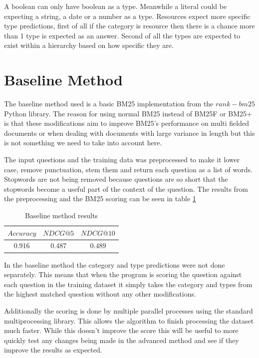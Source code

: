 \documentclass[sigconf]{acmart}
\begin{document}
A boolean can only have boolean as a type. Meanwhile a literal could be expecting a string, a date or a number as a type. Resources expect more specific type predictions, first of all if the category is resource then there is a chance more than 1 type is expected as an answer. Second of all the types are expected to exist within a hierarchy based on how specific they are.



\section{Baseline Method}
The baseline method used is a basic BM25 implementation from the $rank-bm25$ Python library. The reason for using normal BM25 instead of BM25F or BM25+ is that these modifications aim to improve BM25's performance on multi fielded documents or when dealing with documents with large variance in length but this is not something we need to take into account here.

The input questions and the training data was preprocessed to make it lower case, remove punctuation, stem them and return each question as a list of words. Stopwords are not being removed because questions are so short that the stopwords become a useful part of the context of the question. The results from the preprocessing and the BM25 scoring can be seen in table \ref{tab:baseline_res}

\begin{table}[h]
    \centering
    \caption{Baseline method results}
    \begin{tabular}{c|c|c}
    $Accuracy$ & $NDCG@5$ & $NDCG@10$ \\
    \hline
    0.916 & 0.487 & 0.489
    \end{tabular}
    \label{tab:baseline_res}
\end{table}

In the baseline method the category and type predictions were not done separately. This means that when the program is scoring the question against each question in the training dataset it simply takes the category and types from the highest matched question without any other modifications.

Additionally the scoring is done by multiple parallel processes using the standard multiprocessing library. This allows the algorithm to finish processing the dataset much faster. While this doesn't improve the score this will be useful to more quickly test any changes being made in the advanced method and see if they improve the results as expected.
\end{document}
